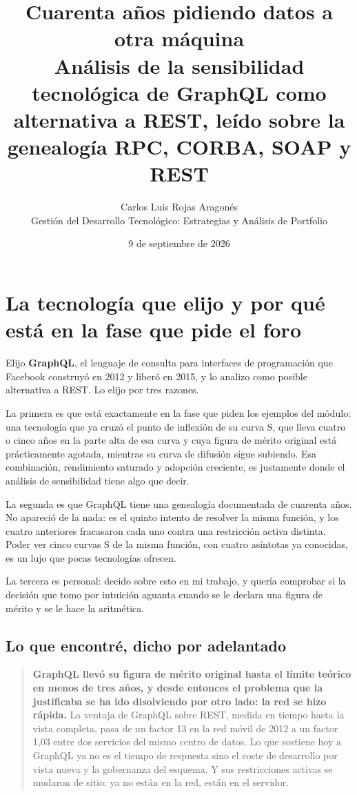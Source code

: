 \documentclass[11pt,letterpaper]{article}
\title{\vspace{-1.2cm}\textbf{Cuarenta años pidiendo datos a otra máquina}\\
\large Análisis de la sensibilidad tecnológica de GraphQL como alternativa a
REST, leído sobre la genealogía RPC, CORBA, SOAP y REST}
\author{Carlos Luis Rojas Aragonés\\
\small Gestión del Desarrollo Tecnológico: Estrategias y Análisis de Portfolio}
\date{\small 9 de septiembre de 2026}
\begin{document}
\maketitle
\vspace{-0.6em}

\section{La tecnología que elijo y por qué está en la fase que pide el foro}

Elijo \textbf{GraphQL}, el lenguaje de consulta para interfaces de programación
que Facebook construyó en 2012 y liberó en 2015, y lo analizo como posible
alternativa a REST. Lo elijo por tres razones.

La primera es que está exactamente en la fase que piden los ejemplos del
módulo: una tecnología que ya cruzó el punto de inflexión de su curva S, que
lleva cuatro o cinco años en la parte alta de esa curva y cuya figura de mérito
original está prácticamente agotada, mientras su curva de difusión sigue
subiendo. Esa combinación, rendimiento saturado y adopción creciente, es
justamente donde el análisis de sensibilidad tiene algo que decir.

La segunda es que GraphQL tiene una genealogía documentada de cuarenta años.
No apareció de la nada: es el quinto intento de resolver la misma función, y
los cuatro anteriores fracasaron cada uno contra una restricción activa
distinta. Poder ver cinco curvas S de la misma función, con cuatro asíntotas ya
conocidas, es un lujo que pocas tecnologías ofrecen.

La tercera es personal: decido sobre esto en mi trabajo, y quería comprobar si
la decisión que tomo por intuición aguanta cuando se le declara una figura de
mérito y se le hace la aritmética.

\subsection*{Lo que encontré, dicho por adelantado}

\begin{quote}
\textbf{GraphQL llevó su figura de mérito original hasta el límite teórico en
menos de tres años, y desde entonces el problema que la justificaba se ha ido
disolviendo por otro lado: la red se hizo rápida.} La ventaja de GraphQL sobre
REST, medida en tiempo hasta la vista completa, pasa de un factor 13 en la red
móvil de 2012 a un factor 1,03 entre dos servicios del mismo centro de datos.
Lo que sostiene hoy a GraphQL ya no es el tiempo de respuesta sino el coste de
desarrollo por vista nueva y la gobernanza del esquema. Y sus restricciones
activas se mudaron de sitio: ya no están en la red, están en el servidor.
\end{quote}
\end{document}
